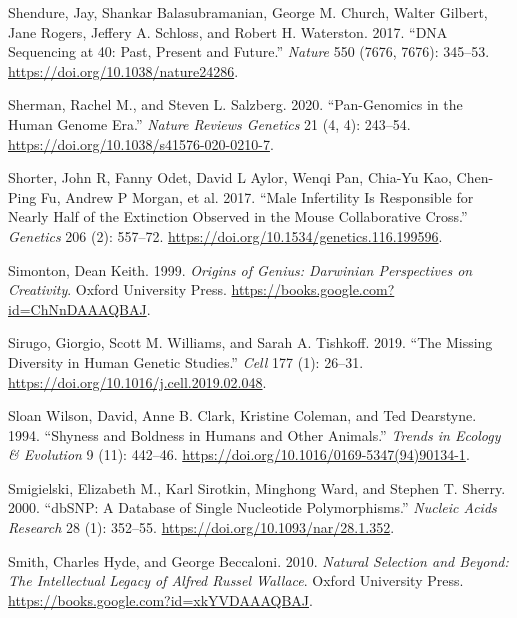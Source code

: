 \documentclass[
]{book}
\newlength{\cslhangindent}
\newlength{\cslentryspacingunit} %
\newenvironment{CSLReferences}[2] %
 {%
  \setlength{\parindent}{0pt}
  \ifodd #1
  \let\oldpar\par
  \def\par{\hangindent=\cslhangindent\oldpar}
  \fi
  \setlength{\parskip}{#2\cslentryspacingunit}
 }%
 {}
\begin{document}
\begin{CSLReferences}{1}{0}
\leavevmode{}%
Shendure, Jay, Shankar Balasubramanian, George M. Church, Walter Gilbert, Jane Rogers, Jeffery A. Schloss, and Robert H. Waterston. 2017. {``{DNA} Sequencing at 40: Past, Present and Future.''} \emph{Nature} 550 (7676, 7676): 345--53. \url{https://doi.org/10.1038/nature24286}.

\leavevmode{}%
Sherman, Rachel M., and Steven L. Salzberg. 2020. {``Pan-Genomics in the Human Genome Era.''} \emph{Nature Reviews Genetics} 21 (4, 4): 243--54. \url{https://doi.org/10.1038/s41576-020-0210-7}.

\leavevmode{}%
Shorter, John R, Fanny Odet, David L Aylor, Wenqi Pan, Chia-Yu Kao, Chen-Ping Fu, Andrew P Morgan, et al. 2017. {``Male {Infertility Is Responsible} for {Nearly Half} of the {Extinction Observed} in the {Mouse Collaborative Cross}.''} \emph{Genetics} 206 (2): 557--72. \url{https://doi.org/10.1534/genetics.116.199596}.

\leavevmode{}%
Simonton, Dean Keith. 1999. \emph{Origins of {Genius}: {Darwinian Perspectives} on {Creativity}}. {Oxford University Press}. \url{https://books.google.com?id=ChNnDAAAQBAJ}.

\leavevmode{}%
Sirugo, Giorgio, Scott M. Williams, and Sarah A. Tishkoff. 2019. {``The {Missing Diversity} in {Human Genetic Studies}.''} \emph{Cell} 177 (1): 26--31. \url{https://doi.org/10.1016/j.cell.2019.02.048}.

\leavevmode{}%
Sloan Wilson, David, Anne B. Clark, Kristine Coleman, and Ted Dearstyne. 1994. {``Shyness and Boldness in Humans and Other Animals.''} \emph{Trends in Ecology \& Evolution} 9 (11): 442--46. \url{https://doi.org/10.1016/0169-5347(94)90134-1}.

\leavevmode{}%
Smigielski, Elizabeth M., Karl Sirotkin, Minghong Ward, and Stephen T. Sherry. 2000. {``{dbSNP}: A Database of Single Nucleotide Polymorphisms.''} \emph{Nucleic Acids Research} 28 (1): 352--55. \url{https://doi.org/10.1093/nar/28.1.352}.

\leavevmode{}%
Smith, Charles Hyde, and George Beccaloni. 2010. \emph{Natural {Selection} and {Beyond}: {The Intellectual Legacy} of {Alfred Russel Wallace}}. {Oxford University Press}. \url{https://books.google.com?id=xkYVDAAAQBAJ}.


\end{CSLReferences}
\end{document}

